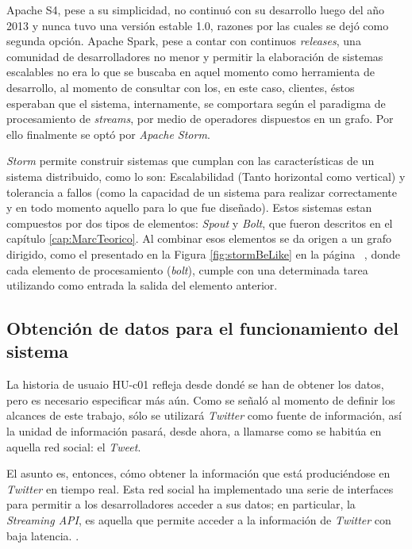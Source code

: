 Apache S4, pese a su simplicidad, no continuó con su desarrollo luego del año 2013 y nunca tuvo una versión estable 1.0, razones por las cuales se dejó como segunda opción. Apache Spark, pese a contar con continuos \textit{releases}, una comunidad de desarrolladores no menor y permitir la elaboración de sistemas escalables no era lo que se buscaba en aquel momento como herramienta de desarrollo, al momento de consultar con los, en este caso, clientes, éstos esperaban que el sistema, internamente, se comportara según el paradigma de procesamiento de \textit{streams}, por medio de operadores dispuestos en un grafo. Por ello finalmente se optó por \textit{Apache Storm}.

\textit{Storm} permite construir sistemas que cumplan con las características de un sistema distribuido, como lo son: Escalabilidad (Tanto horizontal como vertical) y tolerancia a fallos (como la capacidad de un sistema para realizar correctamente y en todo momento aquello para lo que fue diseñado). Estos sistemas estan compuestos por dos tipos de elementos: \textit{Spout} y \textit{Bolt}, que fueron descritos en el capítulo \ref{cap:MarcTeorico}. Al combinar esos elementos se da origen a un grafo dirigido, como el presentado en la Figura \ref{fig:stormBeLike} en la página ~\pageref{fig:stormBeLike}, donde cada elemento de procesamiento (\textit{bolt}), cumple con una determinada tarea utilizando como entrada la salida del elemento anterior.

\subsection{Obtención de datos para el funcionamiento del sistema}
\label{sec:diseno:obtenerDatos}

La historia de usuaio HU-c01 refleja desde dondé se han de obtener los datos, pero es necesario especificar más aún. Como se señaló al momento de definir los alcances de este trabajo, sólo se utilizará \textit{Twitter} como fuente de información, así la unidad de información pasará, desde ahora, a llamarse como se habitúa en aquella red social: el \textit{Tweet}.

El asunto es, entonces, cómo obtener la información que está produciéndose en \textit{Twitter} en tiempo real. Esta red social ha implementado una serie de interfaces para permitir a los desarrolladores acceder a sus datos; en particular, la \textit{Streaming API}, es aquella que permite acceder a la información de \textit{Twitter} con baja latencia. \cite{TwitterStreamingAPI}.

